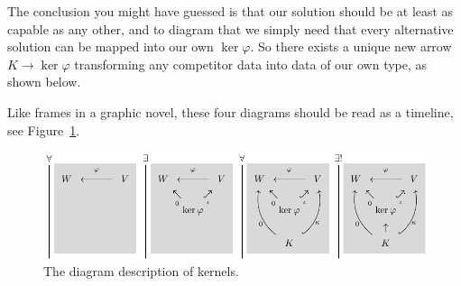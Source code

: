 \documentclass[12pt,twoside,dvipsnames,letterpaper]{memoir}
\begin{document}
The conclusion you might have guessed is that our solution should be 
at least as capable as any other, and to diagram that we simply need that 
every alternative solution can be mapped into our own $\ker \varphi$.  So there
exists a unique new arrow $K\to \ker\varphi$ transforming any competitor data 
into data of our own type, as shown below.
\begin{center}
\end{center}

Like frames in a graphic novel, these four diagrams should be read 
as a timeline, see Figure~\ref{fig:kernel-diag}.  
\begin{figure}[!htbp]
\begin{center}
    \includegraphics[width=\textwidth]{kernel-graphic.pdf}
\end{center}
\caption{The diagram description of kernels.}
\label{fig:kernel-diag}
\end{figure}
\end{document}
